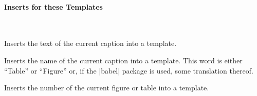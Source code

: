 \paragraph{Inserts for these Templates}\
 
\begin{command}{\insertcaption}
  Inserts the text of the current caption into a template.
\end{command}

\begin{command}{\insertcaptionname}
  Inserts the name of the current caption into a template. This word
  is either ``Table'' or ``Figure'' or, if the |babel| package is
  used, some translation thereof.
\end{command}

\begin{command}{\insertcaptionnumber}
  Inserts the number of the current figure or table into a template.
\end{command}















